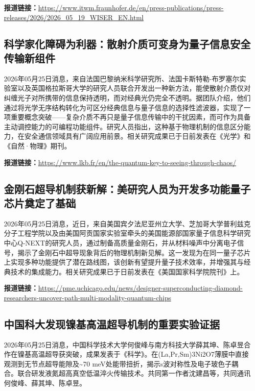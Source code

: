 \documentclass[12pt,a4paper]{ctexart}
\begin{document}
\noindent\textbf{报道链接：}\url{https://www.itwm.fraunhofer.de/en/press-publications/press-releases/2026/2026\_05\_19\_WISER\_EN.html}

\subsection{ 科学家化障碍为利器：散射介质可变身为量子信息安全传输新组件 }

2026年05月25日消息，来自法国巴黎纳米科学研究所、法国卡斯特勒-布罗塞尔实验室以及英国格拉斯哥大学的研究人员联合开发出一种新方法，能使散射介质仅对纠缠光子对所携带的信息保持透明，而对经典光仍完全不透明。据团队介绍，他们通过将光学无序结构转化为可区分经典信息与量子信息的选择性滤波器，实现了一项重要概念突破——复杂介质不再只是量子信息传输中的干扰因素，而可作为具备主动调控能力的可编程功能组件。研究人员指出，这种基于物理机制的信息区分能力，在安全通信领域具有广阔应用前景。相关研究成果已于日前发表在《光学》和《自然·物理》期刊。

\noindent\textbf{报道链接：}\url{https://www.lkb.fr/en/the-quantum-key-to-seeing-through-chaos/}

\subsection{ 金刚石超导机制获新解：美研究人员为开发多功能量子芯片奠定了基础 }

2026年05月25日消息，近日，来自美国宾夕法尼亚州立大学、芝加哥大学普利兹克分子工程学院以及由美国阿贡国家实验室牵头的美国能源部国家量子信息科学研究中心Q-NEXT的研究人员，通过制备高质量金刚石，并从材料噪声中分离电子信号，揭示了金刚石中超导现象背后的物理机制新见解。这一发现为在同一量子芯片上实现多种功能提供了潜在路线图，该创新有望提升量子技术效率，并增强其与经典技术的集成能力。相关研究成果已于日前发表在《美国国家科学院院刊》上。

\noindent\textbf{报道链接：}\url{https://pme.uchicago.edu/news/designer-superconducting-diamond-researchers-uncover-path-multi-modality-quantum-chips}

\subsection{ 中国科大发现镍基高温超导机制的重要实验证据 }

2026年05月25日消息，中国科学技术大学何俊峰与南方科技大学薛其坤、陈卓昱合作在镍基高温超导获突破，成果发表于《科学》。在(La,Pr,Sm)3Ni2O7薄膜中直接观测到无节点超导能隙及\textasciitilde{}70 meV处能带扭折，揭示s波对称性及电子玻色子耦合。联合研发液氮超高真空低温淬火传输技术。共同第一作者沈建昌等，共同通讯何俊峰、薛其坤、陈卓昱。
\end{document}
